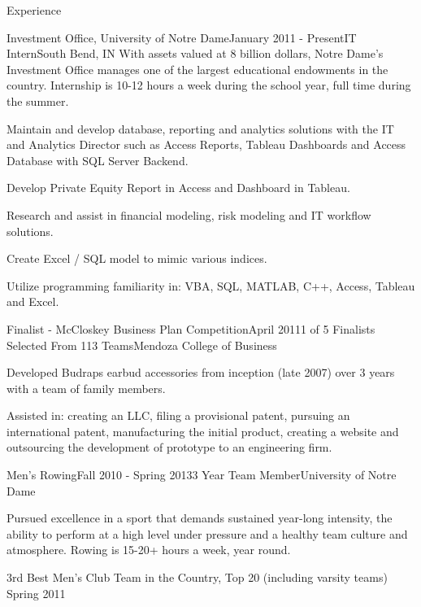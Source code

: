 \documentclass{resume} %
\begin{document}
\begin{rSection}{Experience}

\begin{rSubsection}{Investment Office, University of Notre Dame}{January 2011 - Present}{IT Intern}{South Bend, IN}
With assets valued at 8 billion dollars, Notre Dame’s Investment Office manages one of the largest educational endowments in the country. Internship is 10-12 hours a week during the school year, full time during the summer.
\item Maintain and develop database, reporting and analytics solutions with the IT and Analytics Director such as Access Reports, Tableau Dashboards and Access Database with SQL Server Backend.
\item Develop Private Equity Report in Access and Dashboard in Tableau.
\item Research and assist in financial modeling, risk modeling and IT workflow solutions.
\item Create Excel / SQL model to mimic various indices.
\item Utilize programming familiarity in: VBA, SQL, MATLAB, C++, Access, Tableau and Excel.
\end{rSubsection}


\begin{rSubsection}{Finalist - McCloskey Business Plan Competition}{April 2011}{1 of 5 Finalists Selected From 113 Teams}{Mendoza College of Business}
\item Developed Budraps earbud accessories from inception (late 2007) over 3 years with a team of family members.
\item Assisted in: creating an LLC, filing a provisional patent, pursuing an international patent, manufacturing the initial product, creating a website and outsourcing the development of prototype to an engineering firm.
\end{rSubsection}


\begin{rSubsection}{Men's Rowing}{Fall 2010 - Spring 2013}{3 Year Team Member}{University of Notre Dame}
\item Pursued excellence in a sport that demands sustained year-long intensity, the ability to perform at a high level under pressure and a healthy team culture and atmosphere. Rowing is 15-20+ hours a week, year round.
\item 3rd Best Men’s Club Team in the Country, Top 20 (including varsity teams) \hfill Spring 2011
\end{rSubsection}

\end{rSection}
\end{document}
